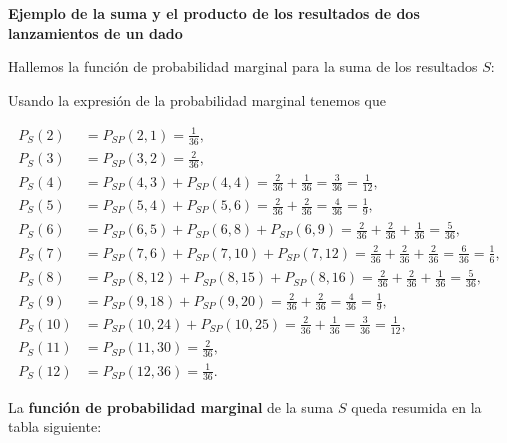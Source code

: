 \documentclass[
  letterpaper,
  DIV=11,
  numbers=noendperiod]{scrreprt}
\begin{document}
\textbf{Ejemplo de la suma y el producto de los resultados de dos
lanzamientos de un dado}

Hallemos la función de probabilidad marginal para la suma de los
resultados \(S\):

Usando la expresión de la probabilidad marginal tenemos que

\[
\begin{array}{rl}
P_S(2) & = P_{SP}(2,1)=\frac{1}{36},\\
P_S(3) & = P_{SP}(3,2)=\frac{2}{36},\\
P_S(4) & = P_{SP}(4,3)+P_{SP}(4,4)=\frac{2}{36}+\frac{1}{36}=\frac{3}{36}=\frac{1}{12},\\
P_S(5) & = P_{SP}(5,4)+P_{SP}(5,6)=\frac{2}{36}+\frac{2}{36}=\frac{4}{36}=\frac{1}{9},\\
P_S(6) & = P_{SP}(6,5)+P_{SP}(6,8)+P_{SP}(6,9)=\frac{2}{36}+\frac{2}{36}+\frac{1}{36}=\frac{5}{36},\\
P_S(7) & = P_{SP}(7,6)+P_{SP}(7,10)+P_{SP}(7,12)=\frac{2}{36}+\frac{2}{36}+\frac{2}{36}=\frac{6}{36}=\frac{1}{6},\\
P_S(8) & = P_{SP}(8,12)+P_{SP}(8,15)+P_{SP}(8,16)=\frac{2}{36}+\frac{2}{36}+\frac{1}{36}=\frac{5}{36},\\
P_S(9) & = P_{SP}(9,18)+P_{SP}(9,20)=\frac{2}{36}+\frac{2}{36}=\frac{4}{36}=\frac{1}{9},\\
P_S(10) & = P_{SP}(10,24)+P_{SP}(10,25)=\frac{2}{36}+\frac{1}{36}=\frac{3}{36}=\frac{1}{12},\\
P_S(11) & = P_{SP}(11,30)=\frac{2}{36},\\
P_S(12) & = P_{SP}(12,36)=\frac{1}{36}.
\end{array}
\]

La \textbf{función de probabilidad marginal} de la suma \(S\) queda
resumida en la tabla siguiente:
\end{document}
